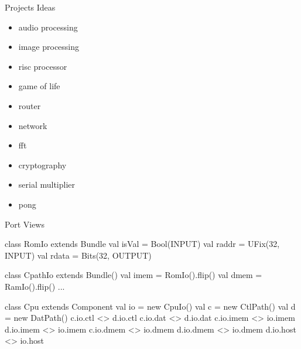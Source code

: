 \documentclass[xcolor=pdflatex,dvipsnames,table]{beamer}
\begin{document}
\begin{frame}[fragile]{Projects Ideas}

\begin{itemize}
\item audio processing
\item image processing
\item risc processor
\item game of life
\item router
\item network
\item fft
\item cryptography
\item serial multiplier
\item pong
\end{itemize}

\end{frame}

\begin{frame}[fragile]{Port Views}

{
\begin{scala}
class RomIo extends Bundle {
  val isVal = Bool(INPUT)
  val raddr = UFix(32, INPUT)
  val rdata = Bits(32, OUTPUT)
}

class CpathIo extends Bundle() {
  val imem = RomIo().flip()
  val dmem = RamIo().flip()
  ...
}

class Cpu extends Component {
  val io = new CpuIo()
  val c  = new CtlPath()
  val d  = new DatPath()
  c.io.ctl  <> d.io.ctl
  c.io.dat  <> d.io.dat
  c.io.imem <> io.imem
  d.io.imem <> io.imem
  c.io.dmem <> io.dmem
  d.io.dmem <> io.dmem
  d.io.host <> io.host
}
\end{scala}
}

\end{frame}

% 
% 
% 
% 
% 
% 
% 
% 
% 
% 
\end{document}
